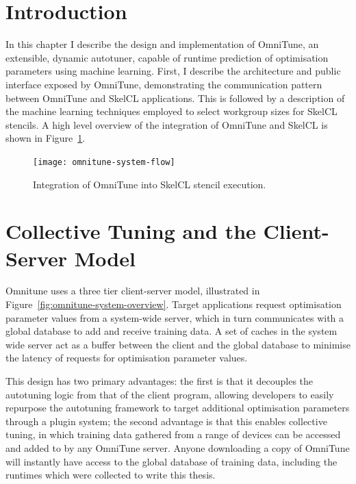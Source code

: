 \section{Introduction}

In this chapter I describe the design and implementation of OmniTune,
an extensible, dynamic autotuner, capable of runtime prediction of
optimisation parameters using machine learning. First, I describe the
architecture and public interface exposed by OmniTune, demonstrating
the communication pattern between OmniTune and SkelCL
applications. This is followed by a description of the machine
learning techniques employed to select workgroup sizes for SkelCL
stencils. A high level overview of the integration of OmniTune and
SkelCL is shown in Figure~\ref{fig:omnitune-system-flow}.


\begin{figure}
\centering
\texttt{[image: omnitune-system-flow]}
\caption{%
  Integration of OmniTune into SkelCL stencil execution.%
}
\label{fig:omnitune-system-flow}
\end{figure}



%

\section{Collective Tuning and the Client-Server Model}

Omnitune uses a three tier client-server model, illustrated in
Figure~\ref{fig:omnitune-system-overview}. Target applications request
optimisation parameter values from a system-wide server, which in turn
communicates with a global database to add and receive training
data. A set of caches in the system wide server act as a buffer
between the client and the global database to minimise the latency of
requests for optimisation parameter values.

This design has two primary advantages: the first is that it decouples
the autotuning logic from that of the client program, allowing
developers to easily repurpose the autotuning framework to target
additional optimisation parameters through a plugin system; the second
advantage is that this enables collective tuning, in which training
data gathered from a range of devices can be accessed and added to by
any OmniTune server. Anyone downloading a copy of OmniTune will
instantly have access to the global database of training data,
including the  runtimes which were collected to
write this thesis.

